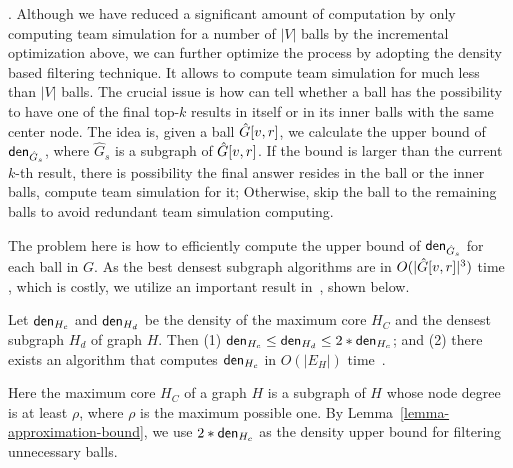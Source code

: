 . Although we have reduced a significant amount of computation by only computing team simulation for a number of $|V|$ balls by the incremental optimization above, we can further optimize the process by adopting the density based filtering technique.
It allows \grouprec to compute team simulation for much less than $|V|$ balls. 
The crucial issue is how can tell whether a ball has the possibility to have one of the final top-$k$ results in itself or in its inner balls with the same center node.
The idea is, given a ball $\hat{G}{[v,r]}$, we calculate the upper bound of ${\mathsf{den}}_{\hat{G}_s}$,
where $\hat{G}_s$ is a subgraph of $\hat{G}{[v,r]}$.
If the bound is larger than the current $k$-th result, \ie there is possibility the final answer resides in the ball or the inner balls, compute team simulation for it;
Otherwise, skip the ball to the remaining balls to avoid redundant team simulation computing.

The problem here is how to efficiently compute the upper bound of ${\mathsf{den}}_{\hat{G}_s}$ for each ball in $G$.
As the best densest subgraph algorithms are in $O(|\hat{G}{[v,r]}|^3)$ time \cite{maximumDenseSubgraph}, which is costly,
we utilize an important result in~\cite{EVMK12}, shown below.



\begin{lemma}
	\label{lemma-approximation-bound}
	Let ${\mathsf{den}}_{H_{c}}$ and ${\mathsf{den}}_{H_{d}}$ be the density of the maximum core  $H_{C}$  and the  densest subgraph $H_{d}$ of graph $H$. Then (1) ${\mathsf{den}}_{H_{c}}\leq {\ensuremath {\mathsf{den}}}_{H_{d}} \leq 2*{\mathsf{den}}_{H_{c}}$; and (2) there exists an algorithm that computes ${\mathsf{den}}_{H_{c}}$ in $O(|E_H|)$ time~\cite{EVMK12}.
\end{lemma}


Here the maximum core $H_{C}$ of a graph $H$ is a subgraph of $H$ whose node degree is at least $\rho$, where $\rho$ is the maximum possible one. By Lemma~\ref{lemma-approximation-bound}, we use $2*{\mathsf{den}}_{H_{c}}$ as the density upper bound for filtering unnecessary balls.


